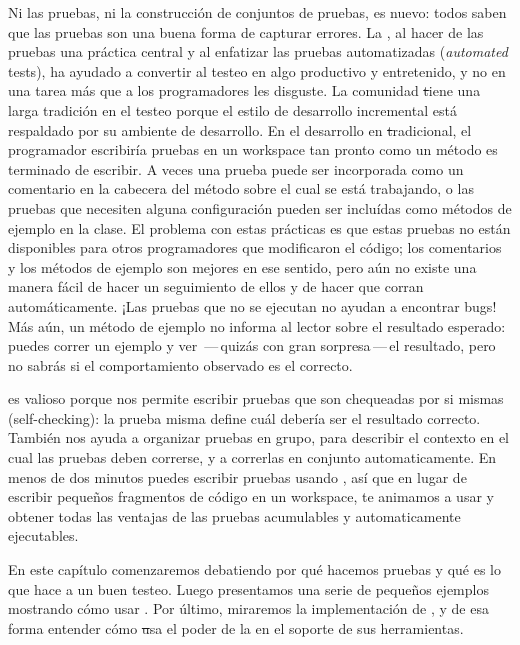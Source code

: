 \documentclass[a4paper,10pt,twoside]{book}
\begin{document}
Ni las pruebas, ni la construcción de conjuntos de pruebas, es nuevo:  todos saben que  las pruebas son una buena forma 
de capturar errores.
La \mbox{,} al hacer de las pruebas una práctica central
y al enfatizar las pruebas automatizadas (\emph{automated} tests), 
ha ayudado a convertir al testeo en algo productivo y entretenido, y no en una tarea más que a los programadores les disguste.
La comunidad \st tiene una larga tradición en el testeo
porque el estilo de desarrollo incremental está respaldado por su ambiente de desarrollo.  
En el desarrollo en \st tradicional, el programador escribiría pruebas en un workspace 
tan pronto como un método es terminado de escribir.
A veces una prueba puede ser incorporada como un comentario en la cabecera
del método sobre el cual se está trabajando,
o las pruebas que necesiten alguna configuración pueden ser incluídas como métodos de ejemplo en la clase.
El problema con estas prácticas es que estas pruebas no están
disponibles para otros programadores que modificaron el código; los comentarios y los métodos de ejemplo son mejores 
en ese sentido, pero aún no existe una manera fácil de hacer un seguimiento de ellos y de hacer que corran automáticamente.
¡Las pruebas que no se ejecutan no ayudan a encontrar bugs!
Más aún, un método de ejemplo no informa al lector sobre el resultado esperado:
puedes correr un ejemplo y ver \,---\,quizás con gran sorpresa\,---\,el resultado, 
pero no sabrás si el comportamiento observado es el correcto.

\sunit es valioso porque nos permite escribir pruebas que son chequeadas por si mismas (self-checking):
la prueba misma define cuál debería ser el resultado correcto.
También nos ayuda a organizar pruebas en grupo, para describir el contexto en el cual las pruebas deben correrse,
 y a correrlas en conjunto automaticamente.
En menos de dos minutos puedes escribir pruebas usando \sunit, así que en lugar de escribir pequeños fragmentos de código en un workspace,
te animamos a usar \sunit y obtener todas las ventajas de las pruebas acumulables y automaticamente ejecutables.

En este capítulo comenzaremos debatiendo por qué hacemos pruebas y qué es lo que hace a un buen testeo. Luego presentamos una serie de 
pequeños ejemplos mostrando cómo usar \sunit.
Por último, miraremos la implementación de \sunit, y de esa forma entender cómo \st usa el poder de la  en el soporte 
de sus herramientas.

\end{document}
